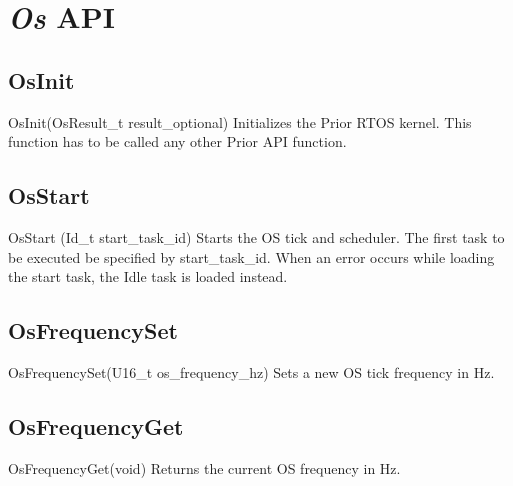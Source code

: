 \section{\textit{Os} API}

\subsection{OsInit}
\label{func:OsInit}
\begin{pdfunction}
{OsInit(OsResult\_t result\_optional) }
{ 
Initializes the Prior RTOS kernel. This function has to be called 
any other Prior API function. }
\end{pdfunction}

\subsection{OsStart}
\label{func:OsStart}
\begin{pdfunction}
{OsStart (Id\_t start\_task\_id) }
{ 
Starts the OS tick and scheduler. The first task to be executed 
be specified by start\_task\_id. When an error occurs while loading the 
start task, the Idle task is loaded instead. }
\end{pdfunction}

\subsection{OsFrequencySet}
\label{func:OsFrequencySet}
\begin{pdfunction}
{OsFrequencySet(U16\_t os\_frequency\_hz) }
{ 
Sets a new OS tick frequency in Hz. }
\end{pdfunction}

\subsection{OsFrequencyGet}
\label{func:OsFrequencyGet}
\begin{pdfunction}
{OsFrequencyGet(void) }
{ 
Returns the current OS frequency in Hz. }
\end{pdfunction}

